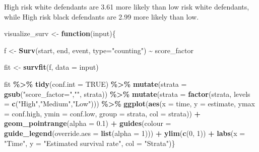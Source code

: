 \documentclass[
]{book}
\newenvironment{Shaded}{\begin{snugshade}}{\end{snugshade}}
\newcommand{\ControlFlowTok}[1]{\textcolor[rgb]{0.13,0.29,0.53}{\textbf{#1}}}
\newcommand{\DataTypeTok}[1]{\textcolor[rgb]{0.13,0.29,0.53}{#1}}
\newcommand{\DecValTok}[1]{\textcolor[rgb]{0.00,0.00,0.81}{#1}}
\newcommand{\FloatTok}[1]{\textcolor[rgb]{0.00,0.00,0.81}{#1}}
\newcommand{\KeywordTok}[1]{\textcolor[rgb]{0.13,0.29,0.53}{\textbf{#1}}}
\newcommand{\NormalTok}[1]{#1}
\newcommand{\OperatorTok}[1]{\textcolor[rgb]{0.81,0.36,0.00}{\textbf{#1}}}
\newcommand{\OtherTok}[1]{\textcolor[rgb]{0.56,0.35,0.01}{#1}}
\newcommand{\StringTok}[1]{\textcolor[rgb]{0.31,0.60,0.02}{#1}}
\begin{document}
High risk white defendants are 3.61 more likely than low risk white defendants, while High risk black defendants are 2.99 more likely than low.

\begin{Shaded}
\begin{Highlighting}[]
\NormalTok{visualize\_surv \textless{}{-}}\StringTok{ }\ControlFlowTok{function}\NormalTok{(input)\{}
  
\NormalTok{f \textless{}{-}}\StringTok{ }\KeywordTok{Surv}\NormalTok{(start, end, event, }\DataTypeTok{type=}\StringTok{"counting"}\NormalTok{) }\OperatorTok{\textasciitilde{}}\StringTok{ }\NormalTok{score\_factor}

\NormalTok{fit \textless{}{-}}\StringTok{ }\KeywordTok{survfit}\NormalTok{(f, }\DataTypeTok{data =}\NormalTok{ input)}

\NormalTok{fit }\OperatorTok{\%\textgreater{}\%}
\StringTok{    }\KeywordTok{tidy}\NormalTok{(}\DataTypeTok{conf.int =} \OtherTok{TRUE}\NormalTok{) }\OperatorTok{\%\textgreater{}\%}
\StringTok{    }\KeywordTok{mutate}\NormalTok{(}\DataTypeTok{strata =} \KeywordTok{gsub}\NormalTok{(}\StringTok{"score\_factor="}\NormalTok{,}\StringTok{""}\NormalTok{, strata)) }\OperatorTok{\%\textgreater{}\%}
\StringTok{    }\KeywordTok{mutate}\NormalTok{(}\DataTypeTok{strata =} \KeywordTok{factor}\NormalTok{(strata, }\DataTypeTok{levels =} \KeywordTok{c}\NormalTok{(}\StringTok{"High"}\NormalTok{,}\StringTok{"Medium"}\NormalTok{,}\StringTok{"Low"}\NormalTok{))) }\OperatorTok{\%\textgreater{}\%}
\StringTok{    }\KeywordTok{ggplot}\NormalTok{(}\KeywordTok{aes}\NormalTok{(}\DataTypeTok{x =}\NormalTok{ time, }\DataTypeTok{y =}\NormalTok{ estimate, }\DataTypeTok{ymax =}\NormalTok{ conf.high, }\DataTypeTok{ymin =}\NormalTok{ conf.low, }\DataTypeTok{group =}\NormalTok{ strata, }\DataTypeTok{col =}\NormalTok{ strata)) }\OperatorTok{+}
\StringTok{    }\KeywordTok{geom\_pointrange}\NormalTok{(}\DataTypeTok{alpha =} \FloatTok{0.1}\NormalTok{) }\OperatorTok{+}
\StringTok{    }\KeywordTok{guides}\NormalTok{(}\DataTypeTok{colour =} \KeywordTok{guide\_legend}\NormalTok{(}\DataTypeTok{override.aes =} \KeywordTok{list}\NormalTok{(}\DataTypeTok{alpha =} \DecValTok{1}\NormalTok{))) }\OperatorTok{+}
\StringTok{    }\KeywordTok{ylim}\NormalTok{(}\KeywordTok{c}\NormalTok{(}\DecValTok{0}\NormalTok{, }\DecValTok{1}\NormalTok{)) }\OperatorTok{+}
\StringTok{    }\KeywordTok{labs}\NormalTok{(}\DataTypeTok{x =} \StringTok{"Time"}\NormalTok{, }\DataTypeTok{y =} \StringTok{"Estimated survival rate"}\NormalTok{, }\DataTypeTok{col =} \StringTok{"Strata"}\NormalTok{)\}}
\end{Highlighting}
\end{Shaded}
\end{document}
